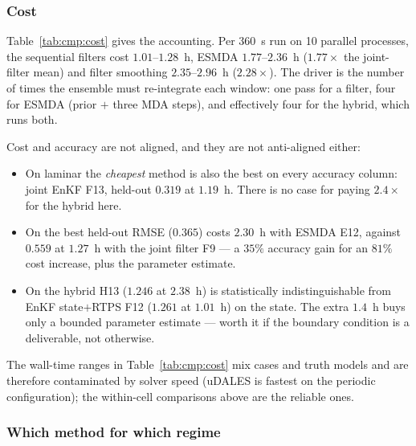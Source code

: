 \subsubsection{Cost}
\label{sec:cmp:cost}

Table~\ref{tab:cmp:cost} gives the accounting. Per \SI{360}{\second} run on 10
parallel processes, the sequential filters cost $1.01$--$1.28$~h, ESMDA
$1.77$--$2.36$~h ($1.77\times$ the joint-filter mean) and filter smoothing
$2.35$--$2.96$~h ($2.28\times$). The driver is the number of times the ensemble
must re-integrate each window: one pass for a filter, four for ESMDA (prior
$+$ three MDA steps), and effectively four for the hybrid, which runs both.

Cost and accuracy are not aligned, and they are not anti-aligned either:

\begin{itemize}[nosep]
  \item On laminar  the \emph{cheapest} method is also the best
        on every accuracy column: joint EnKF F13, held-out $0.319$ at
        $1.19$~h. There is no case for paying $2.4\times$ for the hybrid here.
  \item On  the best held-out RMSE ($0.365$) costs
        $2.30$~h with ESMDA E12, against $0.559$ at $1.27$~h with the joint
        filter F9 --- a $35\%$ accuracy gain for an $81\%$ cost increase, plus
        the parameter estimate.
  \item On  the hybrid H13 ($1.246$ at $2.38$~h) is
        statistically indistinguishable from EnKF state$+$RTPS F12 ($1.261$ at
        $1.01$~h) on the state. The extra $1.4$~h buys only a bounded
        parameter estimate --- worth it if the boundary condition is a
        deliverable, not otherwise.
\end{itemize}

The wall-time ranges in Table~\ref{tab:cmp:cost} mix cases and truth models and
are therefore contaminated by solver speed (uDALES is fastest on the periodic
configuration); the within-cell comparisons above are the reliable ones.

\subsubsection{Which method for which regime}
\label{sec:cmp:recommend}

